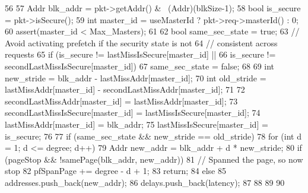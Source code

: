 \begin{DoxyCode}
56 {
57     Addr blk_addr = pkt->getAddr() & ~(Addr)(blkSize-1);
58     bool is_secure = pkt->isSecure();
59     int master_id = useMasterId ? pkt->req->masterId() : 0;
60     assert(master_id < Max_Masters);
61 
62     bool same_sec_state = true;
63     // Avoid activating prefetch if the security state is not
64     // consistent across requests
65     if (is_secure != lastMissIsSecure[master_id] ||
66         is_secure != secondLastMissIsSecure[master_id])
67         same_sec_state = false;
68 
69     int new_stride = blk_addr - lastMissAddr[master_id];
70     int old_stride = lastMissAddr[master_id] - secondLastMissAddr[master_id];
71 
72     secondLastMissAddr[master_id] = lastMissAddr[master_id];
73     secondLastMissIsSecure[master_id] = lastMissIsSecure[master_id];
74     lastMissAddr[master_id] = blk_addr;
75     lastMissIsSecure[master_id] = is_secure;
76 
77     if (same_sec_state && new_stride == old_stride) {
78         for (int d = 1; d <= degree; d++) {
79             Addr new_addr = blk_addr + d * new_stride;
80             if (pageStop && !samePage(blk_addr, new_addr)) {
81                 // Spanned the page, so now stop
82                 pfSpanPage += degree - d + 1;
83                 return;
84             } else {
85                 addresses.push_back(new_addr);
86                 delays.push_back(latency);
87             }
88         }
89     }
90 }
\end{DoxyCode}


